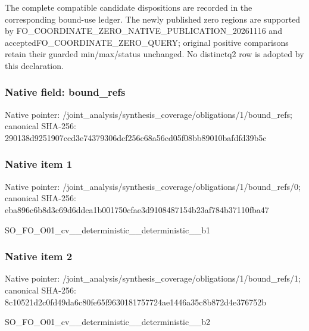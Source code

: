 \documentclass[10pt,a4paper]{article}
\begin{document}
\begingroup\raggedright\sloppy The complete compatible candidate dispositions are recorded in the corresponding bound-use ledger. The newly published zero regions are supported by FO\_\allowbreak{}COORDINATE\_\allowbreak{}ZERO\_\allowbreak{}NATIVE\_\allowbreak{}PUBLICATION\_\allowbreak{}20261116 and acceptedFO\_\allowbreak{}COORDINATE\_\allowbreak{}ZERO\_\allowbreak{}QUERY;\allowbreak{} original positive comparisons retain their guarded min/\allowbreak{}max/\allowbreak{}status unchanged. No distinctq2 row is adopted by this declaration.\par\endgroup

\subsubsection{Native field: bound\_\allowbreak{}refs}
Native pointer: /joint\_\allowbreak{}analysis/synthesis\_\allowbreak{}coverage/obligations/1/bound\_\allowbreak{}refs; canonical SHA-256: 290138d9251907ccd3e74379306dcf256c68a56cd05f08bb89010bafdfd39b5c

\subsubsection{Native item 1}
Native pointer: /joint\_\allowbreak{}analysis/synthesis\_\allowbreak{}coverage/obligations/1/bound\_\allowbreak{}refs/0; canonical SHA-256: eba896c6b8d3c69d6ddca1b001750cfae3d9108487154b23af784b37110fba47

\begingroup\raggedright\sloppy SO\_\allowbreak{}FO\_\allowbreak{}O01\_\allowbreak{}cv\_\allowbreak{}\_\allowbreak{}deterministic\_\allowbreak{}\_\allowbreak{}deterministic\_\allowbreak{}\_\allowbreak{}b1\par\endgroup

\subsubsection{Native item 2}
Native pointer: /joint\_\allowbreak{}analysis/synthesis\_\allowbreak{}coverage/obligations/1/bound\_\allowbreak{}refs/1; canonical SHA-256: 8c10521d2c0fd49da6c80fe65f9630181757724ae1446a35c8b872d4e376752b

\begingroup\raggedright\sloppy SO\_\allowbreak{}FO\_\allowbreak{}O01\_\allowbreak{}cv\_\allowbreak{}\_\allowbreak{}deterministic\_\allowbreak{}\_\allowbreak{}deterministic\_\allowbreak{}\_\allowbreak{}b2\par\endgroup
\end{document}
